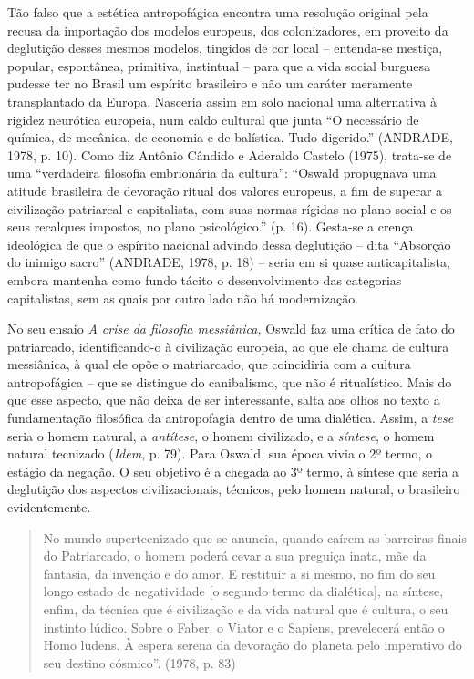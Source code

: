 Tão falso que a estética antropofágica encontra uma resolução original
pela recusa da importação dos modelos europeus, dos colonizadores, em
proveito da deglutição desses mesmos modelos, tingidos de cor local --
entenda-se mestiça, popular, espontânea, primitiva, instintual -- para
que a vida social burguesa pudesse ter no Brasil um espírito brasileiro
e não um caráter meramente transplantado da Europa. Nasceria assim em
solo nacional uma alternativa à rigidez neurótica europeia, num caldo
cultural que junta ``O necessário de química, de mecânica, de economia e
de balística. Tudo digerido.'' (ANDRADE, 1978, p. 10). Como diz Antônio
Cândido e Aderaldo Castelo (1975), trata-se de uma ``verdadeira
filosofia embrionária da cultura'': ``Oswald propugnava uma atitude
brasileira de devoração ritual dos valores europeus, a fim de superar a
civilização patriarcal e capitalista, com suas normas rígidas no plano
social e os seus recalques impostos, no plano psicológico.'' (p. 16).
Gesta-se a crença ideológica de que o espírito nacional advindo dessa
deglutição -- dita ``Absorção do inimigo sacro'' (ANDRADE, 1978, p. 18)
-- seria em si quase anticapitalista, embora mantenha como fundo tácito
o desenvolvimento das categorias capitalistas, sem as quais por outro
lado não há modernização.

No seu ensaio \emph{A crise da filosofia messiânica,} Oswald faz uma
crítica de fato do patriarcado, identificando-o à civilização europeia,
ao que ele chama de cultura messiânica, à qual ele opõe o matriarcado,
que coincidiria com a cultura antropofágica -- que se distingue do
canibalismo, que não é ritualístico. Mais do que esse aspecto, que não
deixa de ser interessante, salta aos olhos no texto a fundamentação
filosófica da antropofagia dentro de uma dialética. Assim, a \emph{tese}
seria o homem natural, a \emph{antítese}, o homem civilizado, e a
\emph{síntese}, o homem natural tecnizado (\emph{Idem}, p. 79). Para
Oswald, sua época vivia o 2º termo, o estágio da negação. O seu objetivo
é a chegada ao 3º termo, à síntese que seria a deglutição dos aspectos
civilizacionais, técnicos, pelo homem natural, o brasileiro
evidentemente.

\begin{quote}
No mundo supertecnizado que se anuncia, quando caírem as barreiras
finais do Patriarcado, o homem poderá cevar a sua preguiça inata, mãe da
fantasia, da invenção e do amor. E restituir a si mesmo, no fim do seu
longo estado de negatividade {[}o segundo termo da dialética{]}, na
síntese, enfim, da técnica que é civilização e da vida natural que é
cultura, o seu instinto lúdico. Sobre o Faber, o Viator e o Sapiens,
prevelecerá então o Homo ludens. À espera serena da devoração do planeta
pelo imperativo do seu destino cósmico''. (1978, p. 83)
\end{quote}

